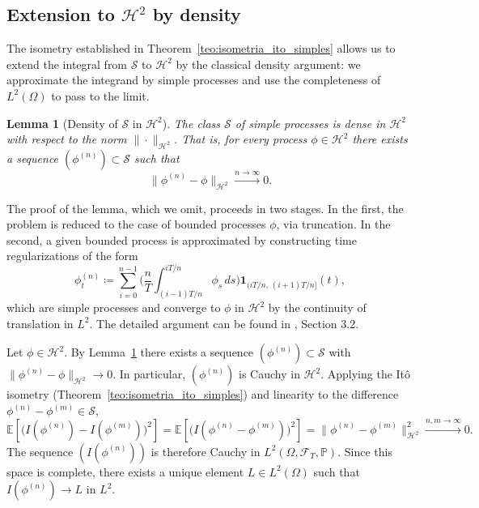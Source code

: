 \documentclass[11pt,a4paper,oneside]{report}
\theoremstyle{plain}
\newtheorem{lema}[teorema]{Lemma}
\theoremstyle{definition}
\theoremstyle{remark}
\newcommand{\E}{\mathbb{E}}
\newcommand{\PP}{\mathbb{P}}
\newcommand{\F}{\mathcal{F}}
\newcommand{\1}{\mathbf{1}}
\newcommand{\eqdef}{\coloneqq}
\begin{document}
\subsection{Extension to $\mathcal{H}^2$ by density}
\label{subsec:extension_H2}

The isometry established in Theorem~\ref{teo:isometria_ito_simples}
allows us to extend the integral from $\mathcal{S}$ to $\mathcal{H}^2$
by the classical density argument: we approximate the integrand by
simple processes and use the completeness of $L^2(\Omega)$ to pass to
the limit.

\begin{lema}[Density of $\mathcal{S}$ in $\mathcal{H}^2$]
\label{lema:densidad_simples}
The class $\mathcal{S}$ of simple processes is dense in
$\mathcal{H}^2$ with respect to the norm $\|\cdot\|_{\mathcal{H}^2}$.
That is, for every process $\phi \in \mathcal{H}^2$ there exists a
sequence $(\phi^{(n)}) \subset \mathcal{S}$ such that
\begin{equation*}
  \|\phi^{(n)} - \phi\|_{\mathcal{H}^2} \xrightarrow{n \to \infty} 0.
\end{equation*}
\end{lema}

The proof of the lemma, which we omit, proceeds in two stages. In the
first, the problem is reduced to the case of bounded processes
$\phi$, via truncation. In the second, a given bounded process is
approximated by constructing time regularizations of the form
\begin{equation*}
  \phi^{(n)}_t \eqdef \sum_{i=0}^{n-1}
                       \biggl(\frac{n}{T} \int_{(i-1) T/n}^{i T/n} \phi_s\,
                              ds\biggr)
                       \mathbf{1}_{(i T/n,\, (i+1) T/n]}(t),
\end{equation*}
which are simple processes and converge to $\phi$ in $\mathcal{H}^2$
by the continuity of translation in $L^2$. The detailed argument can
be found in \cite{karatzas-shreve}, Section 3.2.

Let $\phi \in \mathcal{H}^2$. By Lemma~\ref{lema:densidad_simples}
there exists a sequence $(\phi^{(n)}) \subset \mathcal{S}$ with
$\|\phi^{(n)} - \phi\|_{\mathcal{H}^2} \to 0$. In particular,
$(\phi^{(n)})$ is Cauchy in $\mathcal{H}^2$. Applying the Itô
isometry (Theorem~\ref{teo:isometria_ito_simples}) and linearity to
the difference $\phi^{(n)} - \phi^{(m)} \in \mathcal{S}$,
\begin{equation}\label{eq:cauchy_integral}
  \E\!\left[\bigl(I(\phi^{(n)}) - I(\phi^{(m)})\bigr)^{\!2}\right]
  = \E\!\left[\bigl(I(\phi^{(n)} - \phi^{(m)})\bigr)^{\!2}\right]
  = \|\phi^{(n)} - \phi^{(m)}\|_{\mathcal{H}^2}^2 \xrightarrow{n,m \to \infty} 0.
\end{equation}
The sequence $(I(\phi^{(n)}))$ is therefore Cauchy in
$L^2(\Omega, \F_T, \PP)$. Since this space is complete, there exists
a unique element $L \in L^2(\Omega)$ such that $I(\phi^{(n)}) \to L$
in $L^2$.
\end{document}
